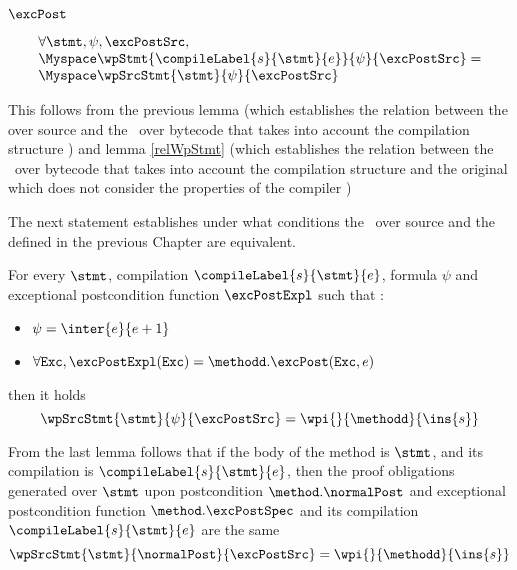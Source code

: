 $\excPost $ 
\begin{wpStmtBcSrc1} \label{wpStmtBcSrc1}
 
$$ 
    \begin{array}{l}
    \forall \stmt, \psi, \excPostSrc , \\
       \Myspace  \wpStmt{\compileLabel{s}{\stmt}{e}}{ \psi }{ \excPostSrc }  = \\
       \Myspace   \wpSrcStmt{\stmt  }{\psi }{ \excPostSrc }  
	 
    \end{array}
 $$
\end{wpStmtBcSrc1}

This follows from the previous lemma (which establishes the relation between the \wpName over source and the \wpName \ over bytecode that takes into account the compilation structure  )
and lemma \ref{relWpStmt} (which establishes the relation between the \wpName \ over bytecode that takes into account the compilation structure  and the original \wpName which does 
not consider the properties of the compiler )


The next statement establishes under what conditions
 the \wpName \  over source and the \wpName defined in the previous Chapter are equivalent.
 

\begin{wpStmtBcSrc2} \label{wpStmtBcSrc2}
For every $\stmt$, compilation $\compileLabel{s}{\stmt}{e}$,  formula $\psi$ and 
   exceptional postcondition  function $\excPostExpl $ such that :
 
  \begin{itemize}
         \item $\psi = \inter{e}{e+1}$
	 \item$\forall \mbox{\rm\texttt{Exc}} ,  \excPostExpl( \mbox{\rm\texttt{Exc}} ) = \methodd.\excPost(\mbox{\rm\texttt{Exc}}, e) $ 
  \end{itemize}
      then it holds 
$$ \wpSrcStmt{\stmt}{\psi }{\excPostSrc }  = \wpi{}{\methodd}{\ins{s} }$$
\end{wpStmtBcSrc2}


From the last lemma follows that if the body of the  method \methodd is $\stmt$, and its compilation is $\compileLabel{s}{\stmt}{e}$, then 
the proof obligations generated over $\stmt$ upon postcondition $\method.\normalPost$ and exceptional
postcondition function  $\method.\excPostSpec$     and its compilation $\compileLabel{s}{\stmt}{e}$ are the same 
$$ \wpSrcStmt{\stmt}{\normalPost }{\excPostSrc }  = \wpi{}{\methodd}{\ins{s} }$$
